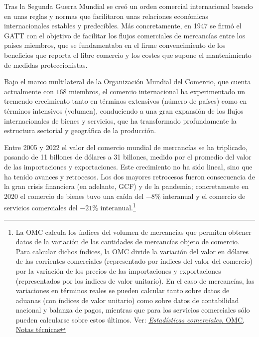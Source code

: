 \documentclass[10pt,a4paper]{article}
\begin{document}
Tras la Segunda Guerra Mundial se creó un orden comercial internacional basado en unas reglas y normas que facilitaron unas relaciones económicas internacionales estables y predecibles. Más concretamente, en 1947 se firmó el GATT con el objetivo de facilitar los flujos comerciales de mercancías entre los países miembros, que se fundamentaba en el firme convencimiento de los beneficios que reporta el libre comercio y los costes que supone el mantenimiento de medidas proteccionistas. 

Bajo el marco multilateral de la Organización Mundial del Comercio, que cuenta actualmente con $168$ miembros, el comercio internacional ha experimentado un tremendo crecimiento tanto en términos extensivos (número de países) como en términos intensivos (volumen), conduciendo a una gran expansión de los flujos internacionales de bienes y servicios, que ha transformado profundamente la estructura sectorial y geográfica de la producción.

Entre 2005 y 2022 el valor del comercio mundial de mercancías se ha triplicado, pasando de 11 billones de dólares a 31 billones, medido por el promedio del valor de las importaciones y exportaciones. Este crecimiento no ha sido lineal, sino que ha tenido avances y retrocesos. Los dos mayores retrocesos fueron consecuencia de la gran crisis financiera (en adelante, GCF) y de la pandemia; concretamente en 2020 el comercio de bienes tuvo una caída del $-8\%$ interanual y el comercio de servicios comerciales del $-21\%$ interanual.\footnote{%
    La OMC calcula los índices del volumen de mercancías que permiten obtener datos de la variación de las cantidades de mercancías objeto de comercio. Para calcular dichos índices, la OMC divide la variación del valor en dólares de las corrientes comerciales (representado por índices del valor del comercio) por la variación de los precios de las importaciones y exportaciones (representados por los índices de valor unitario). En el caso de mercancías, las variaciones en términos reales se pueden calcular tanto sobre datos de aduanas (con índices de valor unitario) como sobre datos de contabilidad nacional y balanza de pagos, mientras que para los servicios comerciales sólo pueden calcularse sobre estos últimos. Ver: \href{https://www.wto.org/spanish/res_s/statis_s/technotes_s.htm}{\textit{Estadísticas comerciales}. OMC, Notas técnicas}
} 
\end{document}
